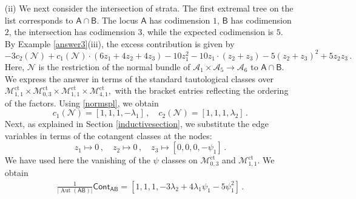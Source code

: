 \documentclass[11pt]{amsart}
\theoremstyle{definition}
\newcommand{\M}{\mathcal{M}}
\newcommand{\A}{\mathcal{A}}
\DeclareMathOperator{\ct}{ct}
\DeclareMathOperator{\Aut}{Aut}
\begin{document}
{\begin{itemize}
\begin{align*}
\frac{1}{|\Aut(\mathsf{E})|}\mathsf{Cont}_{\mathsf E}&=\frac{1}{2}([\psi_1^2+\psi_2^2+\psi_3^2+\psi_1\psi_2+\psi_1\psi_3+\psi_2\psi_3,1,1,1]+[-\psi_1-\psi_2-\psi_3,1,1, \lambda_1]\\&+[-\psi_1-\psi_2-\psi_3,1,\lambda_1,1]+[1,1,1, \psi_1^2-\psi_1\lambda_1]+[1,1,\psi_1^2-\psi_1\lambda_1,1]\\&+[\psi_1+\psi_2+2\psi_3,1,1, \psi_1]+[\psi_1+2\psi_2+\psi_3,1,\psi_1,1]+[1,1,\lambda_1-\psi_1,\lambda_1-\psi_1])\,,\\
\frac{1}{|\Aut(\mathsf{F})|}\mathsf{Cont}_{\mathsf F}&=\frac{1}{6}([\psi_1+\psi_2+\psi_3+\psi_4,1,1,1,1]+[1,1,1,1, \psi_1-\lambda_1])\,,\\
\frac{1}{|\Aut(\mathsf{G})|}\mathsf{Cont}_{\mathsf G}&=\frac{1}{120}[1, 1, 1, 1, 1, 1]\,.
\end{align*}
As before, the first position in the bracket records the contribution of the root, while the next entries correspond to the remaining vertices, listed in increasing order by genus (from left to right in the picture). We slightly simplified the answer by ignoring terms of degree $>2g-3+n$ for each vertex of genus $g$ with $n$ markings, due to  \eqref{vanish}. 
\item [(ii)] We next consider the intersection of strata. The first extremal tree on the list corresponds to $\mathsf A\cap \mathsf B$. The locus $\mathsf A$ has codimension $1$, $\mathsf B$ has codimension $2$, the intersection has codimension $3$, while the expected codimension is $5$. By Example \ref{answer3}(iii), the excess contribution is given by
$$-3c_2(\mathcal N)+c_1(\mathcal N)\cdot (6z_1+4z_2+4z_3)-10z_1^2-10 z_1\cdot (z_2+z_3)-5(z_2+z_3)^2+5z_2z_3\,.$$ Here, $\mathcal N$ is the restriction of the normal bundle of $\A_1\times \A_5\to \A_6$ to $\mathsf A\cap \mathsf B.$ We express the answer in terms of the standard tautological classes over $\M_{1, 1}^{\ct}\times \M_{0, 3}^{\ct}\times \M_{1,1}^{\ct}\times \M^{\ct}_{4,1},$ with the bracket entries reflecting the ordering of the factors. Using \eqref{normspl}, we obtain $$c_1(\mathcal N)=[1, 1, 1, -\lambda_1]\,, \quad c_2(\mathcal N)=[1, 1, 1, \lambda_2]\,.$$ Next, as explained in Section \ref{inductivesection}, we substitute the edge variables in terms of the cotangent classes at the nodes:
 $$z_1\mapsto 0\,,\quad z_2\mapsto 0\,, \quad z_3\mapsto [0, 0, 0, -\psi_1]\,.$$ We have used here the vanishing of the $\psi$ classes on $\M_{0, 3}^{\ct}$ and $\M_{1, 1}^{\ct}.$
We obtain 
\begin{align*}
\frac{1}{|\Aut(\mathsf{AB})|}\mathsf{Cont}_{\mathsf{AB}}=[1,1,1, -3\lambda_2+4\lambda_1\psi_1-5\psi_1^2]\,.
\end{align*} 


\end{itemize}}
\end{document}
